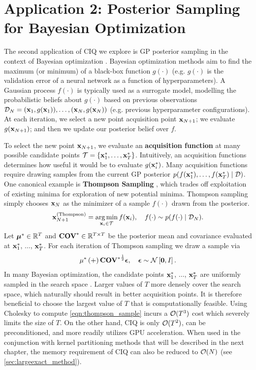\section{Application 2: Posterior Sampling for Bayesian Optimization}
\label{sec:sampling_results}

The second application of CIQ we explore is GP posterior sampling in the context of Bayesian optimization \citep[e.g.][]{snoek2012practical}.
Bayesian optimization methods aim to find the maximum (or minimum) of a black-box function $g(\cdot)$
(e.g. $g(\cdot)$ is the validation error of a neural network as a function of hyperparameters).
A Gaussian process $f(\cdot)$ is typically used as a surrogate model, modelling the probabilistic beliefs about $g(\cdot)$ based on previous observations $\mathcal D_N = (\mathbf{x}_1, g(\mathbf{x}_1)), \ldots, (\mathbf{x}_N, g(\mathbf{x}_N))$ (e.g. previous hyperparameter configurations).
At each iteration, we select a new point acquisition point $\mathbf{x}_{N+1}$; we evaluate $g(\mathbf{x}_{N+1})$; and then we update our posterior belief over $f$.

To select the new point $\mathbf{x}_{N+1}$, we evaluate an {\bf acquisition function} at many possible candidate points $\mathcal{T} = \{ \mathbf{x}^*_1, \ldots, \mathbf{x}^*_T \}$.
Intuitively, an acquisition functions determines how useful it would be to evaluate $g(\mathbf{x}^*_i)$.
Many acquisition functions require drawing samples from the current GP posterior $p(f(\mathbf{x}^*_1), \ldots, f(\mathbf{x}^*_T) \mid \mathcal D)$.
One canonical example is {\bf Thompson Sampling} \cite{thompson1933likelihood}, which trades off exploitation of existing minima for exploration of new potential minima.
Thompson sampling simply chooses $\mathbf{x}_N$ as the minimizer of a sample $f(\cdot)$ drawn from the posterior.
%
\[
  \mathbf{x}^\text{(Thompson)}_{N+1} = \operatorname*{arg\,min}_{\mathbf{x}_i \in \mathcal{T}} f(\mathbf{x}_i),
  \quad
  f(\cdot) \sim p(f(\cdot) \mid \mathcal D_N).
\]
%
Let $\boldsymbol{\mu}^* \in \mathbb{R}^{T}$ and $\textbf{COV}^* \in \mathbb{R}^{T \times T}$ be the posterior mean and covariance evaluated at $\mathbf{x}^*_1$, $\ldots$, $\mathbf{x}^*_T$.
For each iteration of Thompson sampling we draw a sample via
%
\begin{equation}
  \meantest + {\Covtest}^{\frac 1 2} \bepsilon,
  \quad
  \bepsilon \sim \normaldist{\bzero}{\bI}.
  \label{eqn:thompson_sample}
\end{equation}
%
In many Bayesian optimization, the candidate points $\mathbf{x}^*_1$, $\ldots$, $\mathbf{x}^*_T$ are uniformly sampled in the search space \cite{balandat2019botorch}.
Larger values of $T$ more densely cover the search space, which naturally should result in better acquisition points.
It is therefore beneficial to choose the largest value of $T$ that is computationally feasible.
Using Cholesky to compute \cref{eqn:thompson_sample} incurs a $\bigo{T^3}$ cost which severely limits the size of $T$.
On the other hand, CIQ is only $\bigo{T^2}$, can be preconditioned, and more readily utilizes GPU acceleration.
When used in the conjunction with kernel partitioning methods that will be described in the next chapter, the memory requirement of CIQ can also be reduced to $\bigo{N}$ (see \cref{sec:largeexact_method}).


